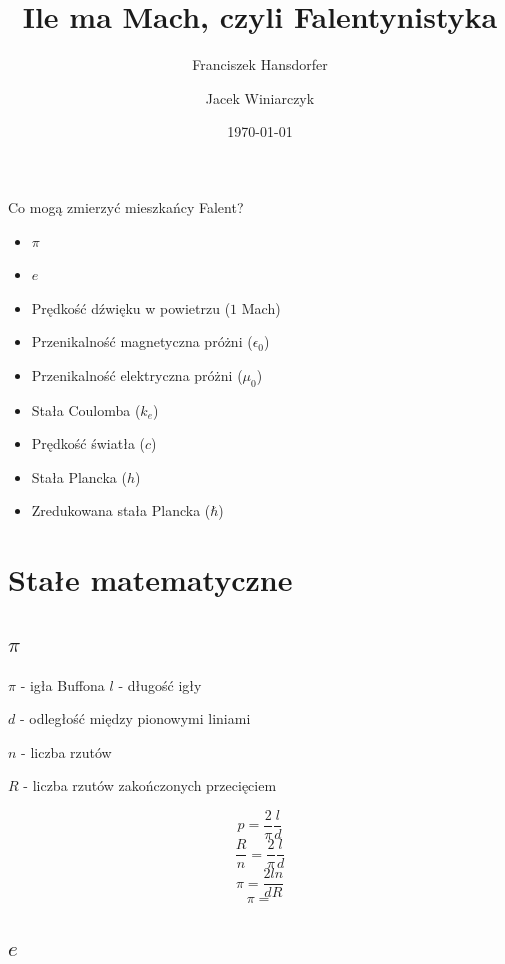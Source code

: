 \documentclass{beamer}
\title{Ile ma Mach, czyli Falentynistyka}
\author{Franciszek Hansdorfer \and Jacek Winiarczyk}
\institute{Wydział fizyki doświadczalnej KFnrD}
\date{\today}
\begin{document}
\begin{frame}
	\titlepage
\end{frame}

\begin{frame}{Co mogą zmierzyć mieszkańcy Falent?}
	\begin{itemize}
		\item $\pi$
		\item $e$
		\item Prędkość dźwięku w powietrzu ($1$ Mach)
		\item Przenikalność magnetyczna próżni ($\epsilon_0$)
		\item Przenikalność elektryczna próżni ($\mu_0$)
		\item Stała Coulomba ($k_e$)
		\item Prędkość światła ($c$)
		\item Stała Plancka ($h$)
		\item Zredukowana stała Plancka ($\hbar$)
	\end{itemize}

\end{frame}

\section{Stałe matematyczne}

\subsection{$\pi$}

\begin{frame}{$\pi$ - igła Buffona}
	$l$ - długość igły

	$d$ - odległość między pionowymi liniami

	$n$ - liczba rzutów

	$R$ - liczba rzutów zakończonych przecięciem

	$$p = \frac{2}{\pi} \frac{l}{d}$$
	$$\frac{R}{n} = \frac{2}{\pi}\frac{l}{d}$$
	$$\pi = \frac{2 l n}{d R}$$
	$$\pi =$$

\end{frame}

\subsection{$e$}


\end{document}
